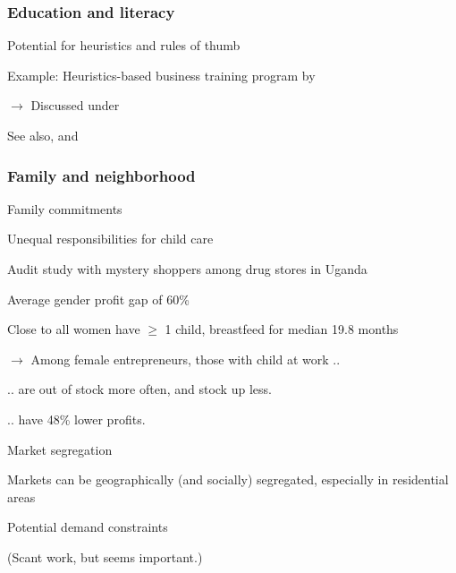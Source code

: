 \documentclass[hideothersubsections, usenames,dvipsnames,11pt]{beamer}
\newenvironment{itemize_2pt}{\itemize\addtolength{\itemsep}{2pt}}{\enditemize}
\begin{document}
\begin{frame}
\frametitle{Education and literacy}

Potential for heuristics and rules of thumb
\begin{itemize_2pt}
	\item Example: Heuristics-based business training program by \citet{Drexler2014}
	\item[] $\rightarrow$ Discussed under \hyperlink{Drexler_thumb}{}
	\item See also, \citet{Cole2018} and \citet{Arraiz2019}
\end{itemize_2pt}
\end{frame}


\begin{frame}
\frametitle{Family and neighborhood}

Family commitments
\begin{itemize_2pt}
	\item \textcolor{bdf}{Unequal responsibilities for child care} \citep{Delecourt2021}
	\begin{itemize_2pt}
		\item Audit study with mystery shoppers among drug stores in Uganda
		\item Average gender profit gap of 60\%
		\item Close to all women have $\geq$ 1 child, breastfeed for median 19.8 months
		\item[] $\rightarrow$ Among female entrepreneurs, those with child at work ..
		\begin{itemize_2pt}
			\item .. are \textcolor{bdf}{out of stock} more often, and stock up less.
			\item .. have \textcolor{bdf}{48\% lower profits}.
		\end{itemize_2pt}
	\end{itemize_2pt}
\end{itemize_2pt}

\pause
\vspace{1.0em}

Market segregation
\begin{itemize_2pt}
	\item Markets can be geographically (and socially) segregated, especially in residential areas
	\begin{itemize_2pt}
		\item Potential \textcolor{bdf}{demand constraints} \citep[in the spirit of][studying women in Ghana]{Hardy2020}
		\item (Scant work, but seems important.)
	\end{itemize_2pt}
\end{itemize_2pt}
\end{frame}
\end{document}
